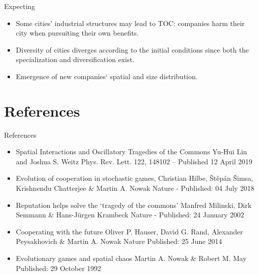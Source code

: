 \documentclass{beamer}
\begin{document}
\begin{frame}{Expecting}
    \begin{itemize}
        \item Some cities' industrial structures may lead to TOC: companies harm their city when pursuiting their own benefits.
        \item Diversity of cities diverges according to the initial conditions since both the specialization and diversification exist.
        \item Emergence of new companies‘ spatial and size distribution.
    \end{itemize}
\end{frame}

\section{References}
\begin{frame}{References}
    \begin{itemize}
        \item Spatial Interactions and Oscillatory Tragedies of the Commons
        Yu-Hui Lin and Joshua S. Weitz
        Phys. Rev. Lett. 122, 148102 – Published 12 April 2019
        \item Evolution of cooperation in stochastic games, Christian Hilbe, Štěpán Šimsa, Krishnendu Chatterjee \& Martin A. Nowak 
        Nature - Published: 04 July 2018
        \item Reputation helps solve the ‘tragedy of the commons’
        Manfred Milinski, Dirk Semmann \& Hans-Jürgen Krambeck Nature - Published: 24 January 2002
        \item Cooperating with the future
        Oliver P. Hauser, David G. Rand, Alexander Peysakhovich \& Martin A. Nowak Nature Published: 25 June 2014
        \item Evolutionary games and spatial chaos
        Martin A. Nowak \& Robert M. May Published: 29 October 1992
    \end{itemize}
\end{frame}
\end{document}
